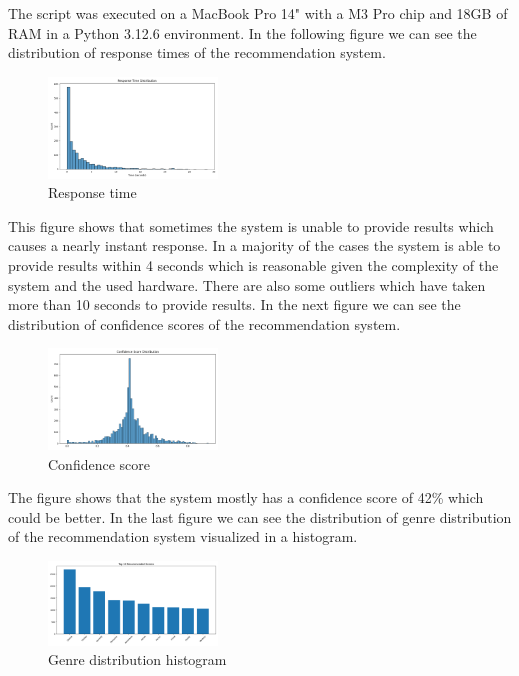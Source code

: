 \documentclass[12pt,a4paper]{article}
\begin{document}
\noindent The script was executed on a MacBook Pro 14" with a M3 Pro chip and 18GB of RAM in a Python 3.12.6 environment.
In the following figure we can see the distribution of response times of the recommendation system.

\begin{figure}[H]
  \centering
  \includegraphics[width=0.4\textwidth]{../assets/response_time_dist.png}
  \caption{Response time}
\end{figure}

\noindent This figure shows that sometimes the system is unable to provide results which causes a nearly instant response.
In a majority of the cases the system is able to provide results within 4 seconds which is reasonable given the complexity of the system and the used hardware.
There are also some outliers which have taken more than 10 seconds to provide results.
In the next figure we can see the distribution of confidence scores of the recommendation system.

\begin{figure}[H]
  \centering
  \includegraphics[width=0.4\textwidth]{../assets/confidence_dist.png}
  \caption{Confidence score}
\end{figure}

\noindent The figure shows that the system mostly has a confidence score of 42\% which could be better.
In the last figure we can see the distribution of genre distribution of the recommendation system visualized in a histogram.

\begin{figure}[H]
  \centering
  \includegraphics[width=0.4\textwidth]{../assets/top_genres.png}
  \caption{Genre distribution histogram}
\end{figure}
\end{document}
